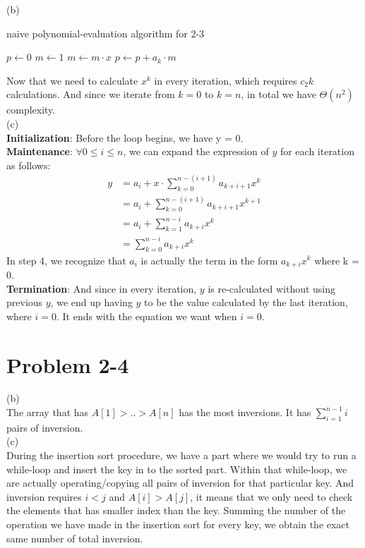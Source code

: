 \documentclass[14pt]{article}
\begin{document}
\noindent(b)\\

\begin{algorithm}
\caption{naive polynomial-evaluation algorithm for 2-3}
\begin{algorithmic}
	\Statex $p \gets 0$
	\Statex $m \gets 1$
			\State $m \gets m \cdot x$
		\EndFor
	\Statex $p \gets p + a_k \cdot m$
	\EndFor
\end{algorithmic}	
\end{algorithm}

Now that we need to calculate $x^k$ in every iteration, which requires $c_2k$ calculations. And since we iterate from $k = 0$ to $k = n$, in total we have $\Theta (n^2)$ complexity.\\

\noindent (c)\\


\textbf{Initialization}:
Before the loop begins, we have y = 0.\\

\textbf{Maintenance}:
$\forall 0 \leq i \leq n $, we can expand the expression of $y$ for each iteration as follows:
\begin{align}
	y &= a_i + x \cdot \sum_{k = 0}^{n-(i+1)} a_{k+i+1}x^k\\
	&= a_i + \sum_{k = 0}^{n-(i+1)} a_{k+i+1}x^{k+1}\\
	&= a_i + \sum_{k = 1}^{n-i} a_{k+i}x^{k}\\
	&= \sum_{k = 0}^{n-i} a_{k+i}x^{k}
\end{align}
In step 4, we recognize that $a_i$ is actually the term in the form $a_{k+i}x^k$ where k = 0.\\

\textbf{Termination}: 
And since in every iteration, $y$ is re-calculated without using previous $y$, we end up having $y$ to be the value calculated by the last iteration, where $i = 0$. It ends with the equation we want when $i = 0$.




\pagebreak
\section*{Problem 2-4}
(b)\\
The array that has $A[1] > .. > A[n]$ has the most inversions. It has $\sum_{i = 1}^{n-1}i$ pairs of inversion.\\

\noindent(c)\\
During the insertion sort procedure, we have a part where we would try to run a while-loop and insert the key in to the sorted part. Within that while-loop, we are actually operating/copying all pairs of inversion for that particular key. And inversion requires $i < j$ and $A[i] > A[j]$, it means that we only need to check the elements that has smaller index than the key. Summing the number of the operation we have made in the insertion sort for every key, we obtain the exact same number of total inversion.\\
\end{document}
